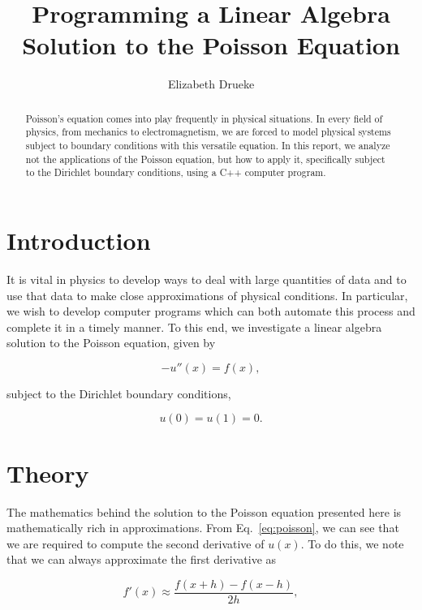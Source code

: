 \documentclass[12pt]{article}
\title{Programming a Linear Algebra Solution to the Poisson Equation}
\author{Elizabeth Drueke}
\numberwithin{equation}{section}
\begin{document}
\maketitle

\begin{abstract}
Poisson's equation comes into play frequently in physical situations.  In every field of physics, from mechanics to electromagnetism, we are forced to model physical systems subject to boundary conditions with this versatile equation.  In this report, we analyze not the applications of the Poisson equation, but how to apply it, specifically subject to the Dirichlet boundary conditions, using a C++ computer program. 
\end{abstract}

\section{Introduction}
\label{sec:into}
It is vital in physics to develop ways to deal with large quantities of data and to use that data to make close approximations of physical conditions.  In particular, we wish to develop computer programs which can both automate this process and complete it in a timely manner.  To this end, we investigate a linear algebra solution to the Poisson equation, given by 

\begin{equation}
\label{eq:poisson}
-u''\left(x\right) = f\left(x\right),
\end{equation}

\noindent subject to the Dirichlet boundary conditions,

\begin{equation}
\label{eq:dirichlet}
u\left(0\right)=u\left(1\right)=0.
\end{equation}

\section{Theory}
\label{sec:theory}
The mathematics behind the solution to the Poisson equation presented here is mathematically rich in approximations.  From Eq.~\ref{eq:poisson}, we can see that we are required to compute the second derivative of $u\left(x\right)$.  To do this, we note that we can always approximate the first derivative as

\begin{equation}
\label{eq:deriv1}
f'\left(x\right) \approx \frac{f\left(x+h\right)-f\left(x-h\right)}{2h},
\end{equation}
\end{document}
